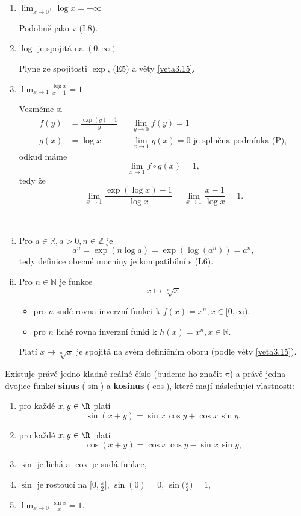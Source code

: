 \begin{enumerate}
	\item[(L9)] \underline{$\lim_{x \to 0^+} \log x = -\infty$}
	\par Podobně jako v (L8).
	\item[(L10)] \underline{$\log$ je spojitá na $(0,\infty)$}
	\par Plyne ze spojitosti $\exp$, (E5) a věty \ref{veta3.15}.
	\item[(L11)] \underline{$\lim_{x \to 1} \frac{\log x}{x-1}=1$}
	\par Vezměme si
	\begin{align*}
		 f(y)&=\frac{\exp(y)-1}{y} & & \lim_{y \to 0} f(y)=1\\
		 g(x) &=\log x & & \lim_{x \to 1} g(x) = 0
			\textrm{ je splněna podmínka (P)},
	\end{align*}
	odkud máme
	$$
        \lim_{x \to 1} f\circ g(x) = 1,
	$$
	tedy že
	$$
	\lim_{x\to 1} \frac{\exp(\log x)-1}{\log x} = \lim_{x\to 1} \frac{x-1}{\log x} = 1.
	$$
\end{enumerate}

\begin{poznamka}\,
\begin{enumerate}[(i)]
	\item Pro $a \in \mathbb R , a > 0, n \in \mathbb Z $ je
	$$
	    a^n= \exp(n\log a)=\exp(\log(a^n))=a^n,
	$$
	tedy definice obecné mocniny je kompatibilní s (L6).
	\item Pro $n\in \mathbb N $ je funkce
	$$
	    x\mapsto \sqrt[n]{x}
	$$
	\begin{itemize}
		\item pro $n$ sudé rovna inverzní funkci k $f(x)=x^n, x \in [0,\infty)$,
		\item pro $n$ liché rovna inverzní funki k $h(x)=x^n, x \in \mathbb R $.
	\end{itemize}
	Platí $x\mapsto \sqrt[n]{x}$ je spojitá na svém definičním oboru (podle věty \ref{veta3.15}).
\end{enumerate}
\end{poznamka}

\begin{veta}\label{veta3.17} %
Existuje právě jedno kladné reálné číslo (budeme ho značit $\pi$) a právě jedna dvojice funkcí \textbf{sinus} ($\sin$) a \textbf{kosinus} ($\cos$),
které mají následující vlastnosti:
\begin{enumerate}
  \item[(G1)] pro každé $x,y\in\R$ platí
  $$\sin(x+y)=\sin x\,\cos y+\cos x\,\sin y,$$
  \item[(G2)] pro každé $x,y\in\R$ platí
  $$\cos(x+y)=\cos x\,\cos y-\sin x\,\sin y,$$
  \item[(G3)] $\sin$ je lichá a $\cos$ je sudá funkce,
  \item[(G4)] $\sin$ je rostoucí na $\big[0,\tfrac{\pi}{2}\big]$, $\sin(0)=0$, $\sin\big(\tfrac{\pi}{2}\big)=1$,
  \item[(G5)] $\displaystyle \lim_{x\to 0} \frac{\sin x}{x}=1$.
\end{enumerate}
\end{veta}


